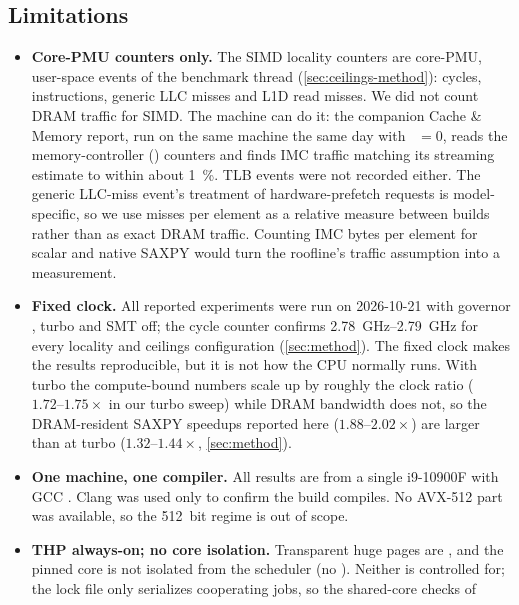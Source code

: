 \subsection{Limitations}
\begin{itemize}
  \item \textbf{Core-PMU counters only.} The SIMD locality counters are core-PMU, user-space
        events of the benchmark thread (\cref{sec:ceilings-method}): cycles, instructions, generic LLC
        misses and L1D read misses. We did not count DRAM traffic for SIMD. The machine can do it:
        the companion Cache \& Memory report, run on the same machine the same day with
        ~$=0$, reads the memory-controller () counters
        and finds IMC traffic matching its streaming estimate to within about \SI{1}{\percent}. TLB
        events were not recorded either. The generic LLC-miss event's treatment of hardware-prefetch
        requests is model-specific, so we use misses per element as a relative measure between
        builds rather than as exact DRAM traffic. Counting IMC bytes per element for scalar and
        native SAXPY would turn the roofline's traffic assumption into a measurement.
  \item \textbf{Fixed clock.} All reported experiments were run on 2026-10-21 with governor
        \sysGovernor{}, turbo \sysTurbo{} and SMT off; the cycle counter confirms
        \qtyrange{2.78}{2.79}{\giga\hertz} for every locality and ceilings configuration
        (\cref{sec:method}). The fixed clock makes the results reproducible, but it is not how the
        CPU normally runs. With turbo the compute-bound numbers scale up by roughly the clock ratio
        ($1.72\text{--}1.75\times$ in our turbo sweep) while DRAM bandwidth does not, so the
        DRAM-resident SAXPY speedups reported here ($1.88\text{--}2.02\times$) are larger than at turbo
        ($1.32\text{--}1.44\times$, \cref{sec:method}).
  \item \textbf{One machine, one compiler.} All results are from a single i9-10900F with GCC
        \sysGCC{}. Clang was used only to confirm the build compiles. No AVX-512 part was available,
        so the \qty{512}{bit} regime is out of scope.
  \item \textbf{THP always-on; no core isolation.} Transparent huge pages are , and
        the pinned core is not isolated from the scheduler (no ). Neither is controlled
        for; the lock file only serializes cooperating jobs, so the shared-core checks of

\end{itemize}
